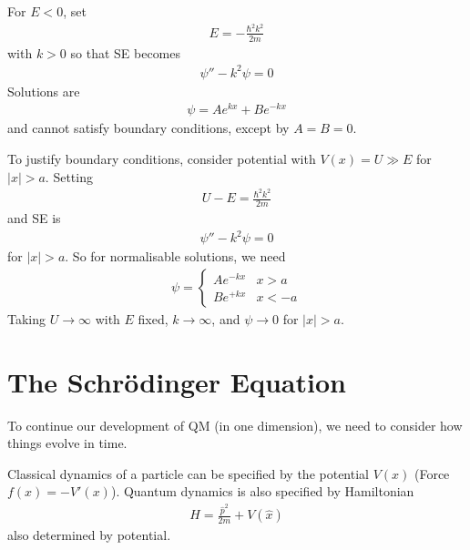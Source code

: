 \documentclass[a4paper]{article}
\begin{document}
For $E<0$, set
\begin{equation*}
\begin{aligned}
E= -\frac{\hbar^2 k^2}{2m}
\end{aligned}
\end{equation*}
with $k>0$ so that SE becomes\begin{equation*}
\begin{aligned}
\psi'' - k^2 \psi = 0
\end{aligned}
\end{equation*}
Solutions are
\begin{equation*}
\begin{aligned}
\psi = A e^{kx} + B e^{-kx}
\end{aligned}
\end{equation*}
and cannot satisfy boundary conditions, except by $A=B=0$.

To justify boundary conditions, consider potential with $V\left(x\right) = U \gg E$ for $|x|>a$. Setting
\begin{equation*}
\begin{aligned}
U-E = \frac{\hbar^2 k^2}{2m}
\end{aligned}
\end{equation*}
and SE is
\begin{equation*}
\begin{aligned}
\psi'' - k^2 \psi = 0
\end{aligned}
\end{equation*}
for $|x|>a$. So for normalisable solutions, we need
\begin{equation*}
\begin{aligned}
\psi = \left\{
\begin{array}{ll}
Ae^{-kx} & x>a\\
Be^{+kx} & x<-a
\end{array}
\right.
\end{aligned}
\end{equation*}
Taking $U \to \infty$ with $E$ fixed, $k \to \infty$, and $\psi \to 0$ for $|x| > a$.

\newpage

\section{The Schr\"{o}dinger Equation}
To continue our development of QM (in one dimension), we need to consider how things evolve in time.

Classical dynamics of a particle can be specified by the potential $V\left(x\right)$ (Force $f\left(x\right) = -V'\left(x\right)$). Quantum dynamics is also specified by Hamiltonian
\begin{equation*}
\begin{aligned}
H = \frac{\hat{p}^2}{2m} + V\left(\hat{x}\right)
\end{aligned}
\end{equation*}
also determined by potential.
\end{document}
